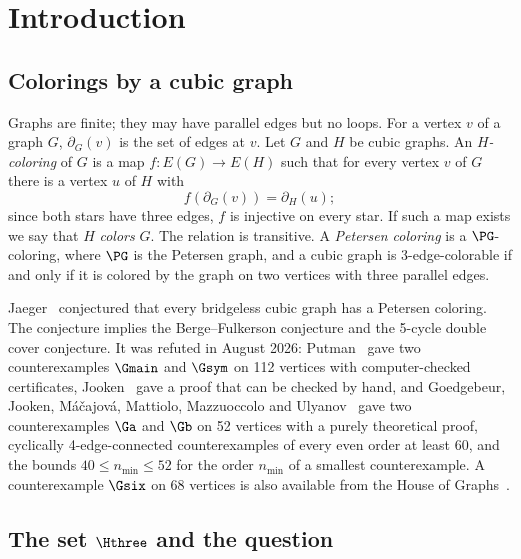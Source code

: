 \section{Introduction}\label{sec:introduction}

\subsection{Colorings by a cubic graph}

Graphs are finite; they may have parallel edges but no loops. For a vertex $v$ of a graph $G$,
$\partial_G(v)$ is the set of edges at $v$. Let $G$ and $H$ be cubic graphs. An
\emph{$H$-coloring} of $G$ is a map $f : E(G) \to E(H)$ such that for every vertex $v$ of $G$
there is a vertex $u$ of $H$ with
\begin{equation}\label{eq:hcoloring}
f(\partial_G(v)) = \partial_H(u);
\end{equation}
since both stars have three edges, $f$ is injective on every star. If such a map exists we say that
$H$ \emph{colors} $G$. The relation is transitive. A \emph{Petersen coloring} is a $\PG$-coloring,
where $\PG$ is the Petersen graph, and a cubic graph is 3-edge-colorable if and only if it is colored
by the graph on two vertices with three parallel edges.

Jaeger~\cite{Jaeger1988} conjectured that every bridgeless cubic graph has a Petersen coloring.
The conjecture implies the Berge--Fulkerson conjecture and the 5-cycle double cover conjecture.
It was refuted in August 2026: Putman~\cite{Putman2026} gave two counterexamples $\Gmain$ and
$\Gsym$ on 112 vertices with computer-checked certificates, Jooken~\cite{Jooken2026} gave a proof that
can be checked by hand, and Goedgebeur, Jooken, M\'a\v{c}ajov\'a, Mattiolo, Mazzuoccolo and
Ulyanov~\cite{GJMMMU2026} gave two counterexamples $\Ga$ and $\Gb$ on 52 vertices with a purely
theoretical proof, cyclically 4-edge-connected counterexamples of every even order at least 60,
and the bounds $40 \le n_{\min} \le 52$ for the order $n_{\min}$ of a smallest counterexample. A
counterexample $\Gsix$ on 68 vertices is also available from the House of
Graphs~\cite{HoG}.

\subsection{The set \texorpdfstring{$\Hthree$}{H3} and the question}

